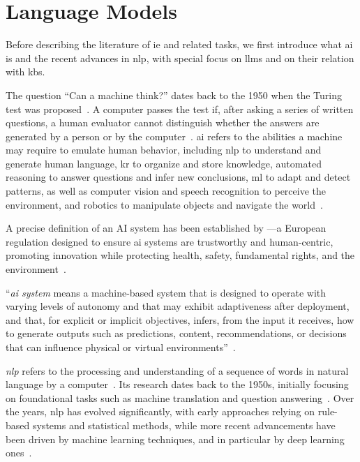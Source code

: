 \section{Language Models}
\label{sec:rw:llms}
Before describing the literature of \ac{ie} and related tasks, we first introduce what \acl{ai} is and the recent advances in \ac{nlp}, with special focus on \acp{llm} and on their relation with \acp{kb}.

The question ``Can a machine think?'' dates back to the 1950 when the Turing test was proposed~\cite{turing1950computing}. A computer passes the test if, after asking a series of written questions, a human evaluator cannot distinguish whether the answers are generated by a person or by the computer~\cite{turing1950computing}.
\Acf{ai} refers to the abilities a machine may require to emulate human behavior, including \acl{nlp} to understand and generate human language, \acl{kr} to organize and store knowledge, automated reasoning to answer questions and infer new conclusions, \acl{ml} to adapt and detect patterns, as well as computer vision and speech recognition to perceive the environment, and robotics to manipulate objects and navigate the world~\cite{russell2020artificial}.

A precise definition of an AI system has been established by \textcite{ai_act}---a European regulation designed to ensure \acl{ai} systems are trustworthy and human-centric, promoting innovation while protecting health, safety, fundamental rights, and the environment~\cite[Article 1]{ai_act}.

\begin{definition}
``\emph{\acs{ai} system} means a machine-based system that is designed to operate with varying levels of autonomy and that may exhibit adaptiveness after deployment, and that, for explicit or implicit objectives, infers, from the input it receives, how to generate outputs such as predictions, content, recommendations, or decisions that can influence physical or virtual environments''~\cite[Article 3]{ai_act}.
\end{definition}


\emph{\Acf{nlp}} refers to the processing and understanding of a sequence of words in natural language by a computer~\cite{bates1995models}.
Its research dates back to the 1950s, initially focusing on foundational tasks such as machine translation and question answering~\cite{bates1995models}.
Over the years, \ac{nlp} has evolved significantly, with early approaches relying on rule-based systems and statistical methods, while more recent advancements have been driven by machine learning techniques, and in particular by deep learning ones~\cite{entityorientedsearch2018balog}.

